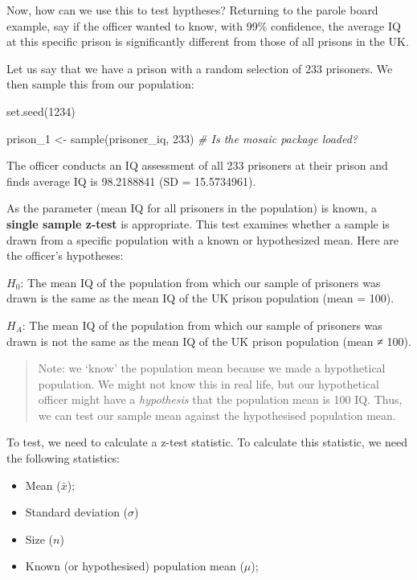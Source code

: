 \documentclass[
]{book}
\newenvironment{Shaded}{\begin{snugshade}}{\end{snugshade}}
\newcommand{\CommentTok}[1]{\textcolor[rgb]{0.56,0.35,0.01}{\textit{#1}}}
\newcommand{\DecValTok}[1]{\textcolor[rgb]{0.00,0.00,0.81}{#1}}
\newcommand{\FunctionTok}[1]{\textcolor[rgb]{0.00,0.00,0.00}{#1}}
\newcommand{\NormalTok}[1]{#1}
\newcommand{\OtherTok}[1]{\textcolor[rgb]{0.56,0.35,0.01}{#1}}
\providecommand{\tightlist}{%
  \setlength{\itemsep}{0pt}\setlength{\parskip}{0pt}}
\begin{document}
Now, how can we use this to test hyptheses? Returning to the parole board example, say if the officer wanted to know, with 99\% confidence, the average IQ at this specific prison is significantly different from those of all prisons in the UK.

Let us say that we have a prison with a random selection of 233 prisoners. We then sample this from our population:

\begin{Shaded}
\begin{Highlighting}[]
\FunctionTok{set.seed}\NormalTok{(}\DecValTok{1234}\NormalTok{)}

\NormalTok{prison\_1 }\OtherTok{\textless{}{-}} \FunctionTok{sample}\NormalTok{(prisoner\_iq, }\DecValTok{233}\NormalTok{) }\CommentTok{\# Is the \textquotesingle{}mosaic\textquotesingle{} package loaded?}
\end{Highlighting}
\end{Shaded}

The officer conducts an IQ assessment of all 233 prisoners at their prison and finds average IQ is 98.2188841 (SD = 15.5734961).

As the parameter (mean IQ for all prisoners in the population) is known, a \textbf{single sample z-test} is appropriate. This test examines whether a sample is drawn from a specific population with a known or hypothesized mean. Here are the officer's hypotheses:

\(H_0\): The mean IQ of the population from which our sample of prisoners was drawn is the same as the mean IQ of the UK prison population (mean = 100).

\(H_A\): The mean IQ of the population from which our sample of prisoners was drawn is not the same as the mean IQ of the UK prison population (mean ≠ 100).

\begin{quote}
Note: we `know' the population mean because we made a hypothetical population. We might not know this in real life, but our hypothetical officer might have a \emph{hypothesis} that the population mean is 100 IQ. Thus, we can test our sample mean against the hypothesised population mean.
\end{quote}

To test, we need to calculate a z-test statistic. To calculate this statistic, we need the following statistics:

\begin{itemize}
\tightlist
\item
  Mean (\(\bar{x}\));
\item
  Standard deviation (\(\sigma\))
\item
  Size (\(n\))
\item
  Known (or hypothesised) population mean (\(\mu\));
\end{itemize}
\end{document}
